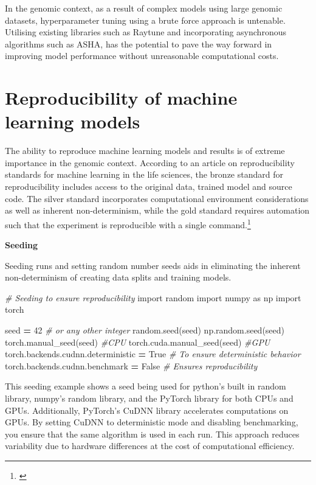 \documentclass[
]{book}
\newenvironment{Shaded}{\begin{snugshade}}{\end{snugshade}}
\newcommand{\CommentTok}[1]{\textcolor[rgb]{0.56,0.35,0.01}{\textit{#1}}}
\newcommand{\DecValTok}[1]{\textcolor[rgb]{0.00,0.00,0.81}{#1}}
\newcommand{\ImportTok}[1]{#1}
\newcommand{\NormalTok}[1]{#1}
\newcommand{\OperatorTok}[1]{\textcolor[rgb]{0.81,0.36,0.00}{\textbf{#1}}}
\newcommand{\VariableTok}[1]{\textcolor[rgb]{0.00,0.00,0.00}{#1}}
\begin{document}
In the genomic context, as a result of complex models using large genomic datasets, hyperparameter tuning using a brute force approach is untenable. Utilising existing libraries such as Raytune and incorporating asynchronous algorithms such as ASHA, has the potential to pave the way forward in improving model performance without unreasonable computational costs.

\chapter{Reproducibility of machine learning models}\label{reproducibility-of-machine-learning-models}

The ability to reproduce machine learning models and results is of extreme importance in the genomic context. According to an article on reproducibility standards for machine learning in the life sciences, the bronze standard for reproducibility includes access to the original data, trained model and source code. The silver standard incorporates computational environment considerations as well as inherent non-determinism, while the gold standard requires automation such that the experiment is reproducible with a single command.\footnote{\citet{ben2021}}

\textbf{Seeding}

Seeding runs and setting random number seeds aids in eliminating the inherent non-determinism of creating data splits and training models.

\begin{Shaded}
\begin{Highlighting}[]
\CommentTok{\# Seeding to ensure reproducibility}
\ImportTok{import}\NormalTok{ random}
\ImportTok{import}\NormalTok{ numpy }\ImportTok{as}\NormalTok{ np}
\ImportTok{import}\NormalTok{ torch}

\NormalTok{seed }\OperatorTok{=} \DecValTok{42}  \CommentTok{\# or any other integer}
\NormalTok{random.seed(seed)}
\NormalTok{np.random.seed(seed)}
\NormalTok{torch.manual\_seed(seed) }\CommentTok{\#CPU}
\NormalTok{torch.cuda.manual\_seed(seed) }\CommentTok{\#GPU}
\NormalTok{torch.backends.cudnn.deterministic }\OperatorTok{=} \VariableTok{True}  \CommentTok{\# To ensure deterministic behavior}
\NormalTok{torch.backends.cudnn.benchmark }\OperatorTok{=} \VariableTok{False}     \CommentTok{\# Ensures reproducibility}
\end{Highlighting}
\end{Shaded}

This seeding example shows a seed being used for python's built in random library, numpy's random library, and the PyTorch library for both CPUs and GPUs. Additionally, PyTorch's CuDNN library accelerates computations on GPUs. By setting CuDNN to deterministic mode and disabling benchmarking, you ensure that the same algorithm is used in each run. This approach reduces variability due to hardware differences at the cost of computational efficiency.
\end{document}

